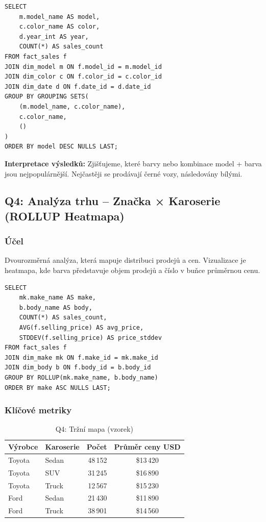 \documentclass[12pt,a4paper]{article}
\begin{document}
\begin{lstlisting}[caption=Q3: GROUPING SETS – Selektivní agregace]
SELECT 
    m.model_name AS model,
    c.color_name AS color,
    d.year_int AS year,
    COUNT(*) AS sales_count
FROM fact_sales f
JOIN dim_model m ON f.model_id = m.model_id
JOIN dim_color c ON f.color_id = c.color_id
JOIN dim_date d ON f.date_id = d.date_id
GROUP BY GROUPING SETS(
    (m.model_name, c.color_name),
    c.color_name,
    ()
)
ORDER BY model DESC NULLS LAST;
\end{lstlisting}

\textbf{Interpretace výsledků:}
Zjišťujeme, které barvy nebo kombinace model + barva jsou nejpopulárnější.
Nejčastěji se prodávají černé vozy, následovány bílými.

\subsection{Q4: Analýza trhu – Značka × Karoserie (ROLLUP Heatmapa)}

\subsubsection{Účel}

Dvourozměrná analýza, která mapuje distribuci prodejů a cen. Vizualizace je heatmapa,
kde barva představuje objem prodejů a číslo v buňce průměrnou cenu.

\begin{lstlisting}[caption=Q4: ROLLUP – Heatmapa na Výrobce × Karoserie]
SELECT 
    mk.make_name AS make,
    b.body_name AS body,
    COUNT(*) AS sales_count,
    AVG(f.selling_price) AS avg_price,
    STDDEV(f.selling_price) AS price_stddev
FROM fact_sales f
JOIN dim_make mk ON f.make_id = mk.make_id
JOIN dim_body b ON f.body_id = b.body_id
GROUP BY ROLLUP(mk.make_name, b.body_name)
ORDER BY make ASC NULLS LAST;
\end{lstlisting}

\subsubsection{Klíčové metriky}

\begin{table}[H]
    \centering
    \small
    \begin{tabular}{|l|l|r|c|}
        \hline
        \textbf{Výrobce} & \textbf{Karoserie} & \textbf{Počet} & \textbf{Průměr ceny USD} \\
        \hline
        Toyota & Sedan & 48\,152 & \$13\,420 \\
        Toyota & SUV & 31\,245 & \$16\,890 \\
        Toyota & Truck & 12\,567 & \$15\,230 \\
        \hline
        Ford & Sedan & 21\,430 & \$11\,890 \\
        Ford & Truck & 38\,901 & \$14\,560 \\
        \hline
    \end{tabular}
    \caption{Q4: Tržní mapa (vzorek)}
\end{table}
\end{document}
